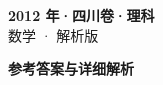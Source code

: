 \documentclass[zihao=-4, a4paper]{ctexart}
\begin{document}
\begin{center}
  {\Large\bfseries 2012 年·四川卷·理科}\\[4pt]
  {\large 数学 · 解析版}
\end{center}
\medskip
{}

\clearpage
{}
\begin{center}{\Large\bfseries 参考答案与详细解析}\end{center}
\medskip

\end{document}

